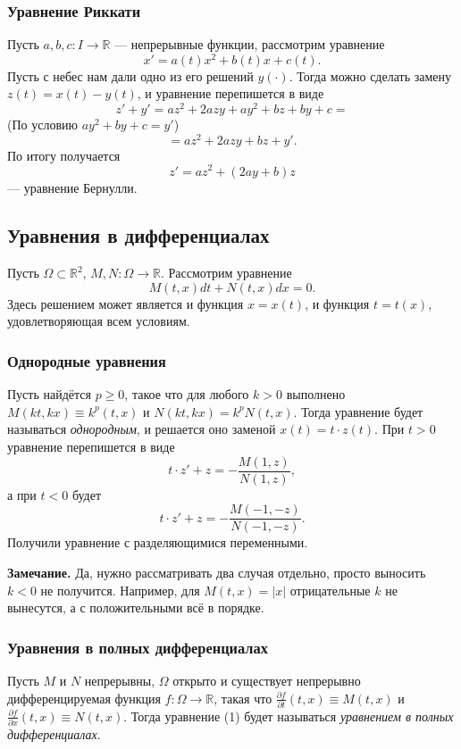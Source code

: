 \subsubsection{Уравнение Риккати}
Пусть $a, b, c: I \to \mathbb R$ --- непрерывные функции, рассмотрим уравнение
\[
    x' = a(t) x^2 + b(t) x + c(t).
\]
Пусть с небес нам дали одно из его решений $y(\cdot)$.
Тогда можно сделать замену $z(t) = x(t) - y(t)$, и уравнение перепишется в виде
\[
    z' + y' = az^2 + 2azy + ay^2 + bz + by + c =
\]
(По условию $ay^2 + by + c = y'$)
\[
    = az^2 + 2azy + bz + y'.
\]
По итогу получается
\[
    z' = az^2 + (2ay + b)z
\]
--- уравнение Бернулли.

\setcounter{equation}{0}
\subsection{Уравнения в дифференциалах}
Пусть $\Omega \subset \mathbb R^2$, $M, N: \Omega \to \mathbb R$. Рассмотрим уравнение 
\[
    M(t, x) dt + N(t, x) dx = 0.
\]
Здесь решением может является и функция $x = x(t)$, и функция $t = t(x)$, удовлетворяющая всем условиям.

\subsubsection{Однородные уравнения}
Пусть найдётся $p \ge 0$, такое что для любого $k > 0$ выполнено $M(kt, kx) \equiv k^p(t, x)$ и $N(kt, kx) = k^p N(t, x)$.
Тогда уравнение будет называться \textit{однородным}, и решается оно заменой $x(t) = t \cdot z(t)$.
При $t > 0$ уравнение перепишется в виде
\[
    t \cdot z' + z = - \frac{M(1, z)}{N(1, z)},
\]
а при $t < 0$ будет
\[
    t \cdot z' + z = - \frac{M(-1, -z)}{N(-1, -z)}.
\]
Получили уравнение с разделяющимися переменными.

\textbf{Замечание.} Да, нужно рассматривать два случая отдельно, просто выносить $k < 0$ не получится.
Например, для $M(t, x) = |x|$ отрицательные $k$ не вынесутся, а с положительными всё в порядке.

\subsubsection{Уравнения в полных дифференциалах}
Пусть $M$ и $N$ непрерывны, $\Omega$ открыто и существует непрерывно дифференцируемая функция $f: \Omega \to \mathbb R$, такая что $\frac{\partial f}{\partial t} (t, x) \equiv M(t, x)$ и $\frac{\partial f}{\partial x} (t, x) \equiv N(t, x)$.
Тогда уравнение (1) будет называться \textit{уравнением в полных дифференциалах}.


